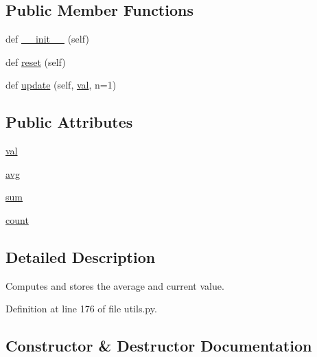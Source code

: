\subsection*{Public Member Functions}
\begin{DoxyCompactItemize}
\item 
def \hyperlink{classparlai_1_1agents_1_1drqa_1_1utils_1_1AverageMeter_a5d31ec2b9b8020da43ab0ca600cbe561}{\+\_\+\+\_\+init\+\_\+\+\_\+} (self)
\item 
def \hyperlink{classparlai_1_1agents_1_1drqa_1_1utils_1_1AverageMeter_adf03b2f21b820b30c0bf68334bda0b6e}{reset} (self)
\item 
def \hyperlink{classparlai_1_1agents_1_1drqa_1_1utils_1_1AverageMeter_a5a66f2a884034fcdf004468a980d1318}{update} (self, \hyperlink{classparlai_1_1agents_1_1drqa_1_1utils_1_1AverageMeter_a0b98a68fd8e5d78852462e6ab3822760}{val}, n=1)
\end{DoxyCompactItemize}
\subsection*{Public Attributes}
\begin{DoxyCompactItemize}
\item 
\hyperlink{classparlai_1_1agents_1_1drqa_1_1utils_1_1AverageMeter_a0b98a68fd8e5d78852462e6ab3822760}{val}
\item 
\hyperlink{classparlai_1_1agents_1_1drqa_1_1utils_1_1AverageMeter_aee254ce04bba670cb5839d0d8b602906}{avg}
\item 
\hyperlink{classparlai_1_1agents_1_1drqa_1_1utils_1_1AverageMeter_ab4cfd9c6c69772ef8828a14e3217508a}{sum}
\item 
\hyperlink{classparlai_1_1agents_1_1drqa_1_1utils_1_1AverageMeter_a4b3a149e43ba378d8cc4af3885e0c68f}{count}
\end{DoxyCompactItemize}


\subsection{Detailed Description}
\begin{DoxyVerb}Computes and stores the average and current value.\end{DoxyVerb}
 

Definition at line 176 of file utils.\+py.



\subsection{Constructor \& Destructor Documentation}
\mbox{\label{classparlai_1_1agents_1_1drqa_1_1utils_1_1AverageMeter_a5d31ec2b9b8020da43ab0ca600cbe561}} 
